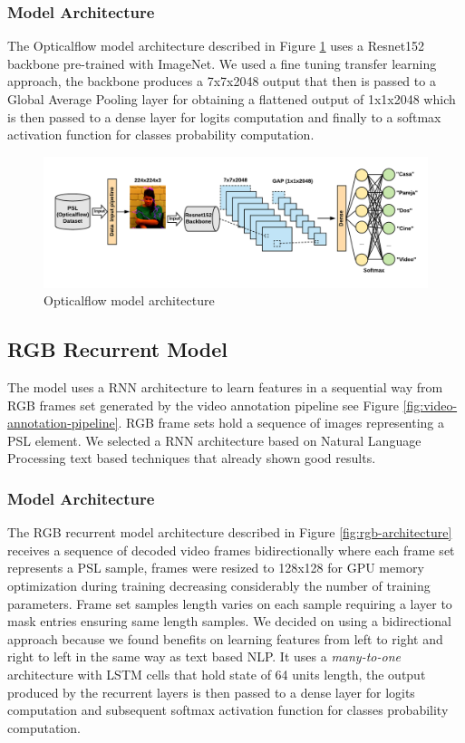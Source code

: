 \documentclass[twocolumn,conference]{article}
\begin{document}
\subsubsection{Model Architecture}\label{opticalflowmodel-architecture}
The Opticalflow model architecture described in Figure \ref{fig:opticalflow-architecture} uses a Resnet152 backbone pre-trained with ImageNet. We used a fine tuning transfer learning approach, the backbone produces a 7x7x2048 output that then is passed to a Global Average Pooling layer for obtaining a flattened output of 1x1x2048 which is then passed to a dense layer for logits computation and finally to a softmax activation function for classes probability computation.
\begin{figure}[hbt!]
\includegraphics[scale=0.8]{images/opticalflow-model-architecture.png}
\caption{Opticalflow model architecture}
\label{fig:opticalflow-architecture}
\end{figure}


\subsection{RGB Recurrent Model}\label{rgbrecurrentmodel}
The model uses a RNN architecture to learn features in a sequential way from RGB frames set generated by the video annotation pipeline see Figure \ref{fig:video-annotation-pipeline}. RGB frame sets hold a sequence of images representing a PSL element. We selected a RNN architecture based on Natural Language Processing text based techniques that already shown good results.
\subsubsection{Model Architecture}\label{rgbrecurrentmodel-architecture}
The RGB recurrent model architecture described in Figure \ref{fig:rgb-architecture} receives a sequence of decoded video frames bidirectionally where each frame set represents a PSL sample, frames were resized to 128x128 for GPU memory optimization during training decreasing considerably the number of training parameters. Frame set samples length varies on each sample requiring a layer to mask entries ensuring same length samples.  We decided on using a bidirectional approach because we found benefits on learning features from left to right and right to left in the same way as text based NLP. It uses a \textit{many-to-one} architecture with LSTM cells that hold state of 64 units length, the output produced by the recurrent layers is then passed to a dense layer for logits computation and subsequent softmax activation function for classes probability computation.
\end{document}
